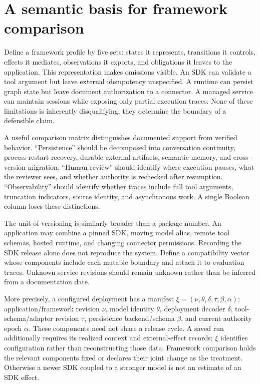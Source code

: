 \section{A semantic basis for framework comparison}\label{sec:C22:axes}
Define a framework profile by five sets: states it represents, transitions it controls, effects it mediates, observations it exports, and obligations it leaves to the application. This representation makes omissions visible. An SDK can validate a tool argument but leave external idempotency unspecified. A runtime can persist graph state but leave document authorization to a connector. A managed service can maintain sessions while exposing only partial execution traces. None of these limitations is inherently disqualifying; they determine the boundary of a defensible claim.

A useful comparison matrix distinguishes documented support from verified behavior. ``Persistence'' should be decomposed into conversation continuity, process-restart recovery, durable external artifacts, semantic memory, and cross-version migration. ``Human review'' should identify where execution pauses, what the reviewer sees, and whether authority is rechecked after resumption. ``Observability'' should identify whether traces include full tool arguments, truncation indicators, source identity, and asynchronous work. A single Boolean column loses these distinctions.

The unit of versioning is similarly broader than a package number. An application may combine a pinned SDK, moving model alias, remote tool schemas, hosted runtime, and changing connector permissions. Recording the SDK release alone does not reproduce the system. Define a compatibility vector whose components include each mutable boundary and attach it to evaluation traces. Unknown service revisions should remain unknown rather than be inferred from a documentation date.

More precisely, a configured deployment has a manifest $\xi=(\nu,\theta,\delta,\tau,\beta,\alpha)$: application/framework revision $\nu$, model identity $\theta$, deployment decoder $\delta$, tool-schema/adapter revision $\tau$, persistence backend/schema $\beta$, and current authority epoch $\alpha$. These components need not share a release cycle. A saved run additionally requires its realized context and external-effect records; $\xi$ identifies configuration rather than reconstructing those data. Framework comparison holds the relevant components fixed or declares their joint change as the treatment. Otherwise a newer SDK coupled to a stronger model is not an estimate of an SDK effect.

